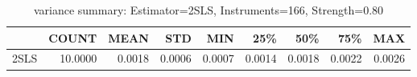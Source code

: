 \begin{table}[ht]
\centering
\caption{variance summary: Estimator=2SLS, Instruments=166, Strength=0.80}
\begin{tabular}{lrrrrrrrr}
\toprule
 & COUNT & MEAN & STD & MIN & 25\% & 50\% & 75\% & MAX \\
\midrule
2SLS & 10.0000 & 0.0018 & 0.0006 & 0.0007 & 0.0014 & 0.0018 & 0.0022 & 0.0026 \\
\bottomrule
\end{tabular}
\end{table}
